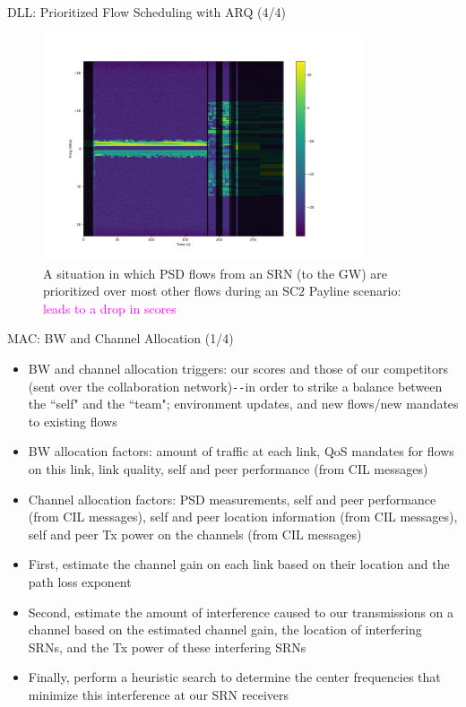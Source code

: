 \documentclass{beamer}
\begin{document}
\begin{frame}{DLL: Prioritized Flow Scheduling with ARQ (4/4)}
\begin{figure}
    \centering
    \includegraphics[width = 0.85\textwidth]{PSD_with_fix_payline.png}
    \caption{A situation in which PSD flows from an SRN (to the GW) are prioritized over most other flows during an SC$2$ Payline scenario: \textcolor{magenta}{leads to a drop in scores}}
    \label{fig:13}
\end{figure}
\end{frame}
\begin{frame}{MAC: BW and Channel Allocation (1/4)}
    \footnotesize{\begin{itemize}
        \item BW and channel allocation triggers: our scores and those of our competitors (sent over the collaboration network)\texttt{-{}-}in order to strike a balance between the ``self" and the ``team"; environment updates, and new flows/new mandates to existing flows
        \item BW allocation factors: amount of traffic at each link, QoS mandates for flows on this link, link quality, self and peer performance (from CIL messages)
        \item Channel allocation factors: PSD measurements, self and peer performance (from CIL messages), self and peer location information (from CIL messages), self and peer Tx power on the channels (from CIL messages)
        \item First, estimate the channel gain on each link based on their location and the path loss exponent
        \item Second, estimate the amount of interference caused to our transmissions on a channel based on the estimated channel gain, the location of interfering SRNs, and the Tx power of these interfering SRNs
        \item Finally, perform a heuristic search to determine the center frequencies that minimize this interference at our SRN receivers
    \end{itemize}}
\end{frame}
\end{document}
